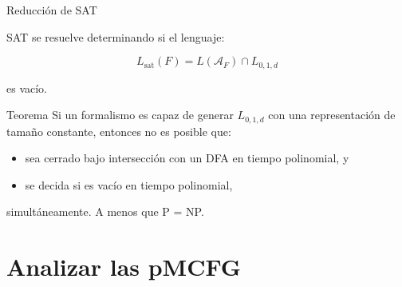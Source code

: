 \documentclass{beamer}
\newcommand{\aut}[1]{\mathcal{A}_{#1}}
\newcommand{\satlang}{L_{\mathrm{sat}}}
\newcommand{\repeatlang}{L_{0,1,d}}
\begin{document}
\begin{frame}{Reducción de SAT}

    \pause

    SAT se resuelve determinando si el lenguaje:

    \[
        \satlang(F) = L(\aut{F}) \cap \repeatlang
    \]

    es vacío.

    \vspace{0.6cm}

    \pause

    \begin{block}{Teorema}
        Si un formalismo es capaz de generar $\repeatlang$ con una representación de tamaño constante, entonces no es posible que:

        \begin{itemize}
            \item sea cerrado bajo intersección con un DFA en tiempo polinomial, y
                  \pause
            \item se decida si es vacío en tiempo polinomial,
        \end{itemize}

        simultáneamente. A menos que P = NP.
    \end{block}

\end{frame}

\section{Analizar las pMCFG}

\begin{frame}
    \tableofcontents
\end{frame}
\end{document}
